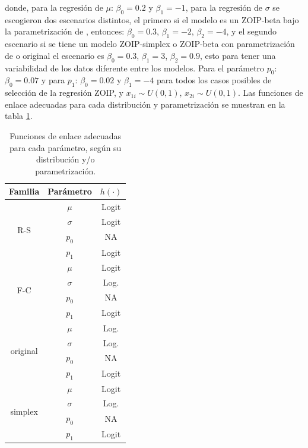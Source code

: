donde, para la regresi\'{o}n de $\mu$: $\beta_0=0.2$ y $\beta_1=-1$, para la regresi\'{o}n de $\sigma$ se escogieron dos escenarios distintos, el primero si el modelo es un ZOIP-beta bajo la parametrizaci\'{o}n de \cite{Stasinopoulos2}, entonces: $\beta_0=0.3$, $\beta_1=-2$, $\beta_2=-4$, y el segundo escenario si se tiene un modelo ZOIP-simplex o ZOIP-beta con parametrizaci\'{o}n de \cite{Ferrari2} o original el escenario es $\beta_0=0.3$, $\beta_1=3$, $\beta_2=0.9$, esto para tener una variabilidad de los datos diferente entre los modelos. Para el par\'{a}metro $p_0$: $\beta_0=0.07$ y para $p_1$: $\beta_0=0.02$ y $\beta_1=-4$ para todos los casos posibles de selecci\'{o}n de la regresi\'{o}n ZOIP, y $x_{1i} \sim U(0,1)$, $x_{2i} \sim U(0,1)$. Las funciones de enlace adecuadas para cada distribuci\'{o}n y parametrizaci\'{o}n se muestran en la tabla \ref{T_F_enlace}.\\

\begin{table}[!hbt]
{\scriptsize
\begin{center}
\begin{tabular}{|c|c|c|}\hline
Familia & Par\'{a}metro & $h(\cdot)$ \\ \hline
\multirow{4}{*}{R-S} & $\mu$ & Logit \\
 & $\sigma$ & Logit \\
 & $p_0$ & NA \\
 & $p_1$ & Logit \\ \hline

\multirow{4}{*}{F-C} & $\mu$ & Logit \\
 & $\sigma$ & Log. \\
 & $p_0$ & NA \\
 & $p_1$ & Logit \\ \hline

\multirow{4}{*}{original} & $\mu$ & Log. \\
 & $\sigma$ & Log. \\
 & $p_0$ & NA \\
 & $p_1$ & Logit \\ \hline

\multirow{4}{*}{simplex} & $\mu$ & Logit \\
 & $\sigma$ & Log. \\
 & $p_0$ & NA \\
 & $p_1$ & Logit \\ \hline

\end{tabular}
\caption{Funciones de enlace adecuadas para cada par\'{a}metro, seg\'{u}n su distribuci\'{o}n y/o parametrizaci\'{o}n.}
\label{T_F_enlace}
\end{center}
}
\end{table}

